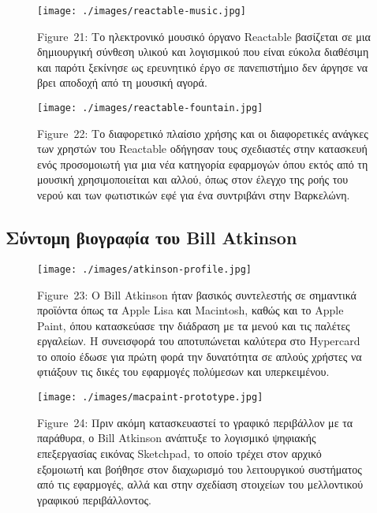 \documentclass[
]{article}
\begin{document}
\leavevmode{}%
\begin{figure}
\hypertarget{fig:reactable-music}{%
\centering
\texttt{[image: ./images/reactable-music.jpg]}
\caption{Figure~21: Το ηλεκτρονικό μουσικό όργανο Reactable βασίζεται σε
μια δημιουργική σύνθεση υλικού και λογισμικού που είναι εύκολα διαθέσιμη
και παρότι ξεκίνησε ως ερευνητικό έργο σε πανεπιστήμιο δεν άργησε να
βρει αποδοχή από τη μουσική αγορά.}\label{fig:reactable-music}
}
\end{figure}

\leavevmode{}%
\begin{figure}
\hypertarget{fig:reactable-fountain}{%
\centering
\texttt{[image: ./images/reactable-fountain.jpg]}
\caption{Figure~22: Το διαφορετικό πλαίσιο χρήσης και οι διαφορετικές
ανάγκες των χρηστών του Reactable οδήγησαν τους σχεδιαστές στην
κατασκευή ενός προσομοιωτή για μια νέα κατηγορία εφαρμογών όπου εκτός
από τη μουσική χρησιμοποιείται και αλλού, όπως στον έλεγχο της ροής του
νερού και των φωτιστικών εφέ για ένα συντριβάνι στην
Βαρκελώνη.}\label{fig:reactable-fountain}
}
\end{figure}

\hypertarget{ux3c3ux3cdux3bdux3c4ux3bfux3bcux3b7-ux3b2ux3b9ux3bfux3b3ux3c1ux3b1ux3c6ux3afux3b1-ux3c4ux3bfux3c5-bill-atkinson}{%
\subsection{Σύντομη βιογραφία του Bill
Atkinson}\label{ux3c3ux3cdux3bdux3c4ux3bfux3bcux3b7-ux3b2ux3b9ux3bfux3b3ux3c1ux3b1ux3c6ux3afux3b1-ux3c4ux3bfux3c5-bill-atkinson}}

\leavevmode{}%
\begin{figure}
\hypertarget{fig:atkinson-profile}{%
\centering
\texttt{[image: ./images/atkinson-profile.jpg]}
\caption{Figure~23: Ο Bill Atkinson ήταν βασικός συντελεστής σε
σημαντικά προϊόντα όπως τα Apple Lisa και Macintosh, καθώς και το Apple
Paint, όπου κατασκεύασε την διάδραση με τα μενού και τις παλέτες
εργαλείων. Η συνεισφορά του αποτυπώνεται καλύτερα στο Hypercard το οποίο
έδωσε για πρώτη φορά την δυνατότητα σε απλούς χρήστες να φτιάξουν τις
δικές του εφαρμογές πολύμεσων και
υπερκειμένου.}\label{fig:atkinson-profile}
}
\end{figure}

\leavevmode{}%
\begin{figure}
\hypertarget{fig:macpaint-prototype}{%
\centering
\texttt{[image: ./images/macpaint-prototype.jpg]}
\caption{Figure~24: Πριν ακόμη κατασκευαστεί το γραφικό περιβάλλον με τα
παράθυρα, ο Bill Atkinson ανάπτυξε το λογισμικό ψηφιακής επεξεργασίας
εικόνας Sketchpad, το οποίο τρέχει στον αρχικό εξομοιωτή και βοήθησε
στον διαχωρισμό του λειτουργικού συστήματος από τις εφαρμογές, αλλά και
στην σχεδίαση στοιχείων του μελλοντικού γραφικού
περιβάλλοντος.}\label{fig:macpaint-prototype}
}
\end{figure}
\end{document}
